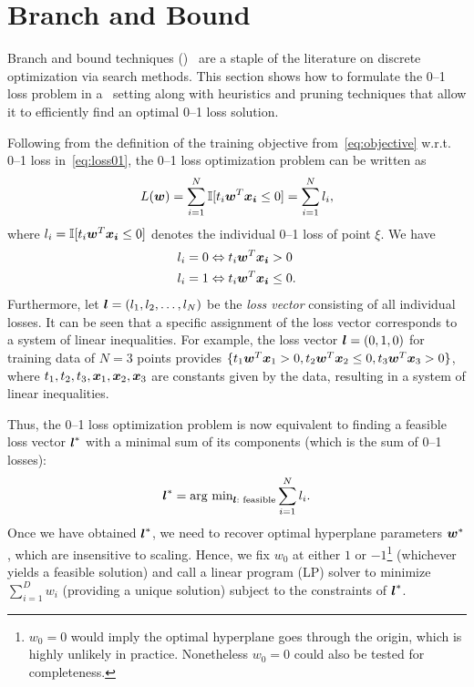 \section{Branch and Bound}
\label{cha:branchandbound}

Branch and bound techniques (\BB)~\cite{bandb} are a staple of the
literature on discrete optimization via search methods.  This section
shows how to formulate the 0--1 loss problem in a \BB\ setting along
with heuristics and pruning techniques that allow it to efficiently
find an optimal 0--1 loss solution.

Following from the definition of the training objective
from~\eqref{eq:objective} w.r.t. 0--1 loss in~\eqref{eq:loss01},
the 0--1 loss optimization problem can be written as
$$L(\boldsymbol{w}) = \sum_{i=1}^N \mathbb{I} [t_i \boldsymbol{w}^T \boldsymbol{x_i} \leq 0] = \sum_{i=1}^N l_i,$$ 
where $l_i =\mathbb{I} [t_i \boldsymbol{w}^T \boldsymbol{x_i} \leq 0]$ denotes the individual 0--1 loss of point $\xi$. We have
\[ \begin{split}
l_i = 0 &\Leftrightarrow t_i \boldsymbol{w}^T \boldsymbol{x_i} > 0 \\
l_i = 1 &\Leftrightarrow t_i \boldsymbol{w}^T \boldsymbol{x_i} \leq 0. \\
\end{split} \] 
Furthermore, let $\boldsymbol{l}=(l_1, l_2, \dots, l_N)$ be the \emph{loss vector}
consisting of all individual losses. It can be seen that a specific
assignment of the loss vector corresponds to a system of linear
inequalities. For example, the loss vector $\boldsymbol{l}=(0,1,0)$ for training
data of $N=3$ points provides 
$\{ t_1 \boldsymbol{w}^T \boldsymbol{x}_1 > 0, t_2 \boldsymbol{w}^T \boldsymbol{x}_2 \leq 0, t_3 \boldsymbol{w}^T \boldsymbol{x}_3 > 0 \}$, 
where $t_1, t_2, t_3, \boldsymbol{x}_1, \boldsymbol{x}_2, \boldsymbol{x}_3$ are constants given by the
data, resulting in a system of linear inequalities.

Thus, the 0--1 loss optimization problem is now equivalent to finding
a feasible loss vector $\boldsymbol{l}^*$ with a minimal sum of its components
(which is the sum of 0--1 losses):
\begin{equation}
\boldsymbol{l}^* = \text{arg min}_{\boldsymbol{l} : \text{ feasible}} \sum_{i=1}^N l_i. \label{eq:bb_obj}
\end{equation}
Once we have obtained $\boldsymbol{l}^*$, we need to recover optimal hyperplane
parameters $\boldsymbol{w}^*$, which are insensitive to scaling.  Hence, we fix
$w_0$ at either $1$ or $-1$\footnote{$w_0 = 0$ would imply the optimal
  hyperplane goes through the origin, which is highly unlikely in
  practice.  Nonetheless $w_0 = 0$ could also be tested for
  completeness.} (whichever yields a feasible solution) and call a
linear program (LP) solver to minimize $\sum_{i=1}^D w_i$ 
(providing a unique solution) subject to the constraints of $\boldsymbol{l}^*$.

